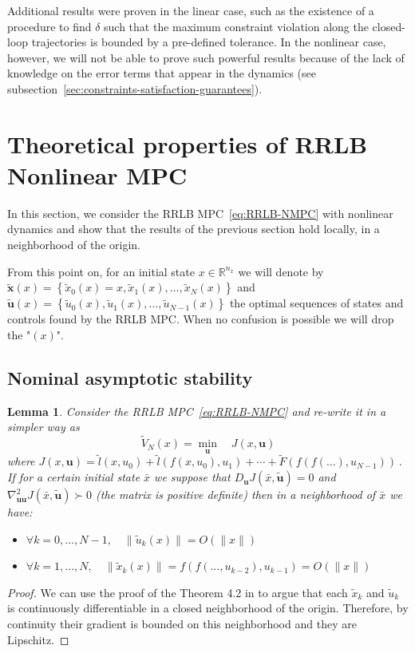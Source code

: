 \documentclass[journal]{IEEEtran}
\newtheorem{lemma}[theorem]{Lemma}
\theoremstyle{definition}
\theoremstyle{remark}
\def\bf#1{\mathbf{#1}}
\newcommand{\R}{\mathbb{R}}
\begin{document}
\noindent Additional results were proven in the linear case, such as the existence of a procedure to find $\delta$ such that the maximum constraint violation along the closed-loop trajectories is bounded by a pre-defined tolerance.
In the nonlinear case, however, we will not be able to prove such powerful results because of the lack of knowledge on the error terms that appear in the dynamics (see subsection~\ref{sec:constraints-satisfaction-guarantees}).

\section{Theoretical properties of RRLB Nonlinear MPC}\label{sec:RRLB-theoretical-properties}

In this section, we consider the RRLB MPC~\ref{eq:RRLB-NMPC} with nonlinear dynamics and show that the results of the previous section hold locally, in a neighborhood of the origin.

From this point on, for an initial state $x\in\R^{n_x}$ we will denote by \newline
$\tilde{\bf{x}}(x)=\left\{ \tilde{x}_0(x)=x,\tilde{x}_1(x),\ldots,\tilde{x}_N(x) \right\}$ and $\tilde{\bf{u}}(x)=\left\{ \tilde{u}_0(x),\tilde{u}_1(x),\ldots,\tilde{u}_{N-1}(x) \right\}$ the optimal sequences of states and controls found by the RRLB MPC.
When no confusion is possible we will drop the "$(x)$".

\subsection{Nominal asymptotic stability}\label{sec:RRLB-nominal-stability}

\begin{lemma}
	\label{thm:Lipschitzianity}
	Consider the RRLB MPC~\ref{eq:RRLB-NMPC} and re-write it in a simpler way as
	$$\tilde{V}_N(x)=\underset{\bf{u}}{\min} \quad J(x,\bf{u})$$
	where $J(x,\bf{u})=\tilde{l}(x,u_0)+\tilde{l}(f(x,u_0),u_1)+\cdots+\tilde{F}(f(f(...),u_{N-1}))$\,.
	If for a certain initial state $\bar{x}$ we suppose that $D_\bf{u}J(\bar{x},\tilde{\bf{u}})=0$ and $\nabla_{\bf{u}\bf{u}}^2J(\bar{x}, \tilde{\bf{u}})\succ 0$ (the matrix is positive definite) then in a neighborhood of $\bar{x}$ we have:
	\begin{itemize}[label=\textbullet]
		\item $\forall k=0,\ldots,N-1,\quad \|\tilde{u}_k(x)\|=O(\|x\|)$
		\item $\forall k=1,\ldots,N,\quad \|\tilde{x}_k(x)\|=f(f(\ldots,u_{k-2}),u_{k-1})=O(\|x\|)$
	\end{itemize}
\end{lemma}
\begin{proof}
	We can use the proof of the Theorem 4.2 in \cite{lectures-parametric-optimization} to argue that each $\tilde{x}_k$ and $\tilde{u}_k$ is continuously differentiable in a closed neighborhood of the origin.
	Therefore, by continuity their gradient is bounded on this neighborhood and they are Lipschitz.
\end{proof}
\end{document}
